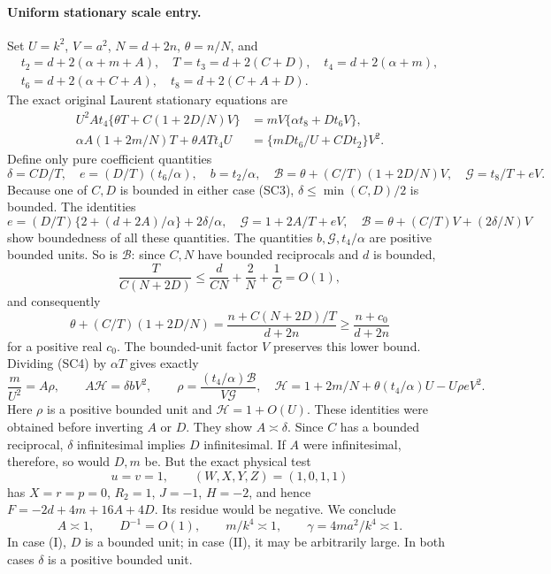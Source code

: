 \paragraph{Uniform stationary scale entry.}
Set $U=k^2$, $V=a^2$, $N=d+2n$, $\theta=n/N$, and
\[
\begin{gathered}
 t_2=d+2(\alpha+m+A),\quad T=t_3=d+2(C+D),\quad
 t_4=d+2(\alpha+m),\\
 t_6=d+2(\alpha+C+A),\quad t_8=d+2(C+A+D).
\end{gathered}
\]
The exact original Laurent stationary equations are
\[
\begin{split}
 U^2 A t_4\{\theta T+C(1+2D/N)V\}
     &=mV\{\alpha t_8+Dt_6V\},\\
 \alpha A(1+2m/N)T+\theta A Tt_4U
     &=\{mDt_6/U+CDt_2\}V^2.                         
\end{split}\tag{SC4}
\]
Define only pure coefficient quantities
\[
 \delta=CD/T,\quad e=(D/T)(t_6/\alpha),\quad b=t_2/\alpha,
 \quad \mathcal B=\theta+(C/T)(1+2D/N)V,
 \quad \mathcal G=t_8/T+eV.
\]
Because one of $C,D$ is bounded in either case (SC3),
$\delta\leq\min(C,D)/2$ is bounded. The identities
\[
 e=(D/T)\{2+(d+2A)/\alpha\}+2\delta/\alpha,
 \quad \mathcal G=1+2A/T+eV,
 \quad \mathcal B=\theta+(C/T)V+(2\delta/N)V
\]
show boundedness of all these quantities. The quantities
$b,\mathcal G,t_4/\alpha$ are positive bounded units. So is
$\mathcal B$: since $C,N$ have bounded reciprocals and $d$ is
bounded,
\[
 \frac{T}{C(N+2D)}\leq\frac d{CN}+\frac2N+\frac1C=O(1),
\]
and consequently
\[
 \theta+(C/T)(1+2D/N)
 =\frac{n+C(N+2D)/T}{d+2n}
 \geq\frac{n+c_0}{d+2n}
\]
for a positive real $c_0$. The bounded-unit factor $V$ preserves
this lower bound. Dividing (SC4) by $\alpha T$ gives exactly
\[
 \frac m{U^2}=A\rho,\qquad
 A\mathcal H=\delta bV^2,\qquad
 \rho=\frac{(t_4/\alpha)\mathcal B}{V\mathcal G},\quad
 \mathcal H=1+2m/N+\theta(t_4/\alpha)U-U\rho eV^2.      \tag{SC5}
\]
Here $\rho$ is a positive bounded unit and $\mathcal H=1+O(U)$.
These identities were obtained before inverting $A$ or $D$.
They show $A\asymp\delta$. Since $C$ has a bounded reciprocal,
$\delta$ infinitesimal implies $D$ infinitesimal.
If $A$ were infinitesimal, therefore, so would $D,m$ be.
But the exact physical test
\[
 u=v=1,\qquad (W,X,Y,Z)=(1,0,1,1)
\]
has $X=r=p=0$, $R_2=1$, $J=-1$, $H=-2$, and hence
$F=-2d+4m+16A+4D$. Its residue would be negative. We conclude
\[
 A\asymp1,\qquad D^{-1}=O(1),\qquad
 m/k^4\asymp1,\qquad \gamma=4ma^2/k^4\asymp1.        \tag{SC6}
\]
In case (I), $D$ is a bounded unit; in case (II), it may be
arbitrarily large. In both cases $\delta$ is a positive bounded unit.

